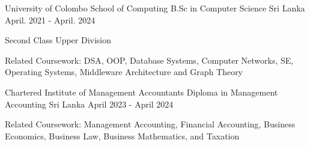 

\begin{cventries}

    \cventry
    {University of Colombo School of Computing} %
    {B.Sc in Computer Science} %
    {Sri Lanka} %
    {April. 2021 - April. 2024} %
    {
        \begin{cvitems} %
            \item {Second Class Upper Division}
            \item {Related Coursework: DSA, OOP, Database Systems, Computer Networks, SE, Operating Systems, Middleware Architecture and Graph Theory}
        \end{cvitems}
    }

    \cventry
    {Chartered Institute of Management Accountants} %
    {Diploma in Management Accounting} %
    {Sri Lanka} %
    {April 2023 - April 2024}
    {
        \begin{cvitems} %
            \item {Related Coursework: Management Accounting, Financial Accounting, Business Economics, Business Law, Business Mathematics, and Taxation}
        \end{cvitems}
    }




\end{cventries}
